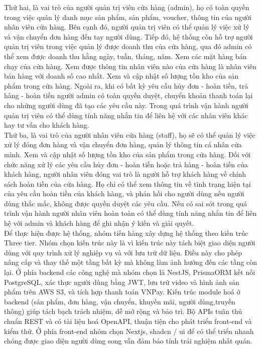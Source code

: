 Thứ hai, là vai trò của người quản trị viên cửa hàng (admin), họ có toàn quyền trong việc quản lý danh mục sản phẩm, sản phẩm, voucher, thông tin của người nhân viên cửa hàng. Bên cạnh đó, người quản trị viên có thể quản lý việc xử lý và vận chuyển đơn hàng đến tay người dùng. Tiếp đó, hệ thống còn hỗ trợ người quản trị viên trong việc quản lý được doanh thu của cửa hàng, qua đó admin có thể xem được  doanh thu hằng ngày, tuần, tháng, năm. Xem các mặt hàng bán chạy của cửa hàng. Xem được thông tin nhân viên nào của cửa hàng là nhân viên bán hàng với doanh số cao nhất. Xem và cập nhật số lượng tồn kho của sản phẩm trong cửa hàng. Ngoài ra, khi có bất kỳ yêu cầu hủy đơn - hoàn tiền, trả hàng - hoàn tiền người admin có toàn quyền duyệt, chuyển khoản thanh toán lại cho những người dùng đã tạo các yêu cầu này. Trong quá trình vận hành người quản trị viên có thể dùng tính năng nhắn tin để liên hệ với các nhân viên khác hay tư vấn cho khách hàng. \\

Thứ ba, là vai trò của người nhân viên cửa hàng (staff), họ sẽ có thể quản lý việc xử lý đóng đơn hàng và vận chuyển đơn hàng, quản lý thông tin cá nhân cửa mình. Xem và cập nhật số lượng tồn kho của sản phẩm trong cửa hàng. Đối với chức năng xử lý các yêu cầu hủy đơn - hoàn tiền hoặc trả hàng - hoàn tiền của khách hàng, người nhân viên đóng vai trò là người hỗ trợ khách hàng về chính sách hoàn tiền của cửa hàng. Họ chỉ có thể xem thông tin về tình trạng hiện tại của yêu cầu hoàn tiền của khách hàng, và phản hồi cho người dùng nếu người dùng thắc mắc, không được quyền duyệt các yêu cầu. Nếu có sai sót trong quá trình vận hành người nhân viên hoàn toàn có thể dùng tính năng nhắn tin để liên hệ với admin và khách hàng để ghi nhận ý kiến và giải quyết. \\

Để thực hiện được hệ thống, nhóm tiến hàng xây dựng hệ thống theo kiến trúc Three tier. Nhóm chọn kiến trúc này là vì kiến trúc này tách biệt giao diện người dùng với quy trình xử lý nghiệp vụ và với lưu trữ dữ liệu. Điều này cho phép nâng cấp và thay thế một tầng bất kỳ mà không làm ảnh hưởng đến các tầng còn lại. Ở phía backend các công nghệ mà nhóm chọn là NestJS, PrismaORM kết nối PostgreSQL, xác thực người dùng bằng JWT, lưu trữ video và hình ảnh sản phẩm trên AWS S3, và tích hợp thanh toán VNPay. Kiến trúc module hoá ở backend (sản phẩm, đơn hàng, vận chuyển, khuyến mãi, người dùng,truyền thông) giúp tách bạch trách nhiệm, dễ mở rộng và bảo trì. Bộ APIs tuân thủ chuẩn REST và có tài liệu hoá OpenAPI, thuận tiện cho phát triển front-end và kiểm thử. Ở phía front-end nhóm chọn Nextjs, shadcn / ui để có thể triển nhanh chóng được giao diện người dùng song vẫn đảm bảo tính trải nghiệm nhất quán.
\clearpage
{}
